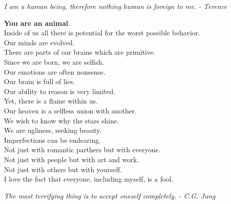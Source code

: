 \documentclass[a4paper,hidelinks]{article}
\begin{document}
\newpage

\begin{center}
\textit{
I am a human being, therefore nothing human is foreign to me. - Terence
}
\end{center}

\noindent
\textbf{You are an animal}.\\
Inside of us all there is potential for the worst possible behavior.\\
Our minds are evolved.\\
There are parts of our brains which are primitive.\\
Since we are born, we are selfish.\\
Our emotions are often nonsense.\\
Our brain is full of lies.\\
Our ability to reason is very limited.\\
Yet, there is a flame within us.\\
Our heaven is a selfless union with another.\\
We wish to know why the stars shine.\\
We are ugliness, seeking beauty.\\
Imperfections can be endearing.\\
Not just with romantic parthers but with everyone.\\
Not just with people but with art and work.\\
Not just with others but with yourself.\\
I love the fact that everyone, including myself, is a fool.\\

\newpage

\begin{center}
\textit{
The most terrifying thing is to accept oneself completely. - C.G. Jung
}
\end{center}
\end{document}
